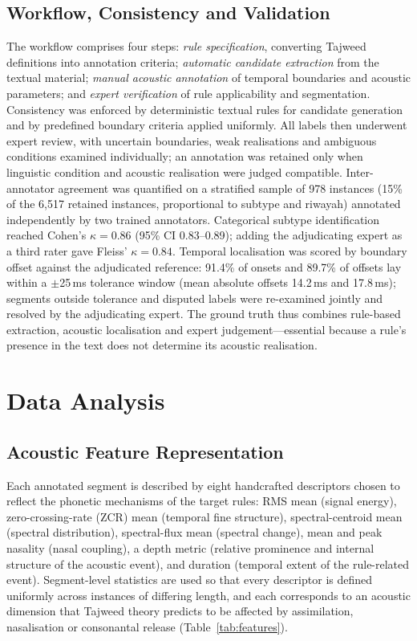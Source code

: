 \documentclass[runningheads]{llncs}
\begin{document}
\subsection{Workflow, Consistency and Validation}

The workflow comprises four steps: \emph{rule specification}, converting Tajweed
definitions into annotation criteria; \emph{automatic candidate extraction} from
the textual material; \emph{manual acoustic annotation} of temporal boundaries
and acoustic parameters; and \emph{expert verification} of rule applicability
and segmentation. Consistency was enforced by deterministic textual rules for
candidate generation and by predefined boundary criteria applied uniformly. All
labels then underwent expert review, with uncertain boundaries, weak
realisations and ambiguous conditions examined individually; an annotation was
retained only when linguistic condition and acoustic realisation were judged
compatible. Inter-annotator agreement was quantified on a stratified sample of
978 instances (15\% of the 6{,}517 retained instances, proportional to subtype
and riwayah)
annotated independently by two trained annotators. Categorical subtype
identification reached Cohen's $\kappa = 0.86$ (95\% CI 0.83--0.89); adding the
adjudicating expert as a third rater gave Fleiss' $\kappa = 0.84$. Temporal
localisation was scored by boundary offset against the adjudicated reference:
91.4\% of onsets and 89.7\% of offsets lay within a $\pm$25\,ms tolerance
window (mean absolute offsets 14.2\,ms and 17.8\,ms); segments outside
tolerance and disputed labels were re-examined jointly and resolved by the
adjudicating expert. The
ground truth thus combines rule-based extraction, acoustic localisation and
expert judgement---essential because a rule's presence in the text does not
determine its acoustic realisation.


\section{Data Analysis}
\label{sec:analysis}

\subsection{Acoustic Feature Representation}

Each annotated segment is described by eight handcrafted descriptors chosen to
reflect the phonetic mechanisms of the target rules: RMS mean (signal energy),
zero-crossing-rate (ZCR) mean (temporal fine structure), spectral-centroid mean
(spectral distribution), spectral-flux mean (spectral change), mean and peak
nasality (nasal coupling), a depth metric (relative prominence and internal
structure of the acoustic event), and duration (temporal extent of the
rule-related event). Segment-level statistics are used so that every descriptor
is defined uniformly across instances of differing length, and each corresponds
to an acoustic dimension that Tajweed theory predicts to be affected by
assimilation, nasalisation or consonantal release (Table~\ref{tab:features}).
\end{document}
